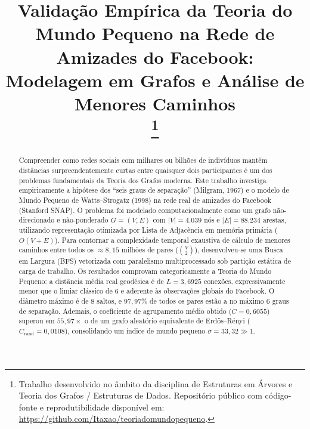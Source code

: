 \documentclass[conference]{IEEEtran}
\begin{document}
\title{Validação Empírica da Teoria do Mundo Pequeno na Rede de Amizades do Facebook: Modelagem em Grafos e Análise de Menores Caminhos\\
\thanks{Trabalho desenvolvido no âmbito da disciplina de Estruturas em Árvores e Teoria dos Grafos / Estruturas de Dados. Repositório público com código-fonte e reprodutibilidade disponível em: \url{https://github.com/Itaxao/teoriadomundopequeno}.}
}

\author{
}

\maketitle

\begin{abstract}
Compreender como redes sociais com milhares ou bilhões de indivíduos mantêm distâncias surpreendentemente curtas entre quaisquer dois participantes é um dos problemas fundamentais da Teoria dos Grafos moderna. Este trabalho investiga empiricamente a hipótese dos ``seis graus de separação'' (Milgram, 1967) e o modelo de Mundo Pequeno de Watts--Strogatz (1998) na rede real de amizades do Facebook (Stanford SNAP). O problema foi modelado computacionalmente como um grafo não-direcionado e não-ponderado $G=(V, E)$ com $|V|=4.039$ nós e $|E|=88.234$ arestas, utilizando representação otimizada por Lista de Adjacência em memória primária ($O(V+E)$). Para contornar a complexidade temporal exaustiva de cálculo de menores caminhos entre todos os $\approx 8,15$ milhões de pares ($\binom{V}{2}$), desenvolveu-se uma Busca em Largura (BFS) vetorizada com paralelismo multiprocessado sob partição estática de carga de trabalho. Os resultados comprovam categoricamente a Teoria do Mundo Pequeno: a distância média real geodésica é de $L = 3,6925$ conexões, expressivamente menor que o limiar clássico de 6 e aderente às observações globais do Facebook. O diâmetro máximo é de 8 saltos, e $97,97\%$ de todos os pares estão a no máximo 6 graus de separação. Ademais, o coeficiente de agrupamento médio obtido ($C = 0,6055$) superou em $55,97\times$ o de um grafo aleatório equivalente de Erdős--Rényi ($C_{\text{rand}} = 0,0108$), consolidando um índice de mundo pequeno $\sigma = 33,32 \gg 1$.
\end{abstract}
\end{document}
